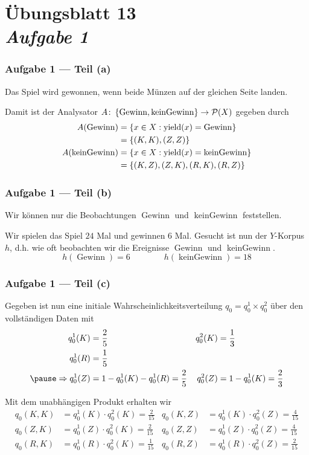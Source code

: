 \documentclass{beamer}
\DeclareMathOperator{\yield}{yield}
\DeclareMathOperator{\win}{Gewinn}
\DeclareMathOperator{\nowin}{kein Gewinn}
\begin{document}
\section{Übungsblatt 13 \\ \textit{Aufgabe 1}}

\begin{frame} \frametitle{Aufgabe 1 --- Teil (a)}
	\justifying \small	
	Das Spiel wird gewonnen, wenn beide Münzen auf der gleichen Seite landen.
	
	\pause
	
	Damit ist der Analysator $A \colon \menge{\win, \nowin} \to \mathcal{P}(X)$ gegeben durch
	\begin{equation*}
		\begin{aligned}
			A(\win) &= \menge{x \in X: \yield(x) = \win} \\
					&= \menge{(K,K), (Z,Z)} \\
			A(\nowin) &= \menge{x \in X: \yield(x) = \nowin} \\
					  &= \menge{(K,Z), (Z,K),(R,K),(R,Z)}
		\end{aligned}
	\end{equation*}
\end{frame}

\begin{frame} \frametitle{Aufgabe 1 --- Teil (b)}
	\justifying \small 
	Wir können nur die Beobachtungen $\win$ und $\nowin$ feststellen. 
	
	Wir spielen das Spiel $24$ Mal und gewinnen $6$ Mal. Gesucht ist nun der $Y$-Korpus $h$, d.h. wie oft beobachten wir die Ereignisse $\win$ und $\nowin$.
	\pause
	\begin{equation*}
		h(\win) = 6 \qquad\qquad h(\nowin) = 18
	\end{equation*}
\end{frame}

\begin{frame} \frametitle{Aufgabe 1 --- Teil (c)}
	\justifying \footnotesize
	Gegeben ist nun eine initiale Wahrscheinlichkeitsverteilung $q_0 = q_0^1 \times q_0^2$ über den vollständigen Daten mit
	\begin{align*}
	q_0^1(K) &= \frac{2}{5} & q_0^2(K) &= \frac{1}{3} \\
	q_0^1(R) &= \frac{1}{5} \\ \pause
	\Rightarrow
	q_0^1(Z) &= 1 - q_0^1(K) - q_0^1(R) = \frac{2}{5} 
	&
	q_0^2(Z) &= 1 - q_0^1(K) = \frac{2}{3}
	\end{align*}
	
	\pause
	Mit dem unabhängigen Produkt erhalten wir
	\begin{align*}
	q_0(K,K) &= q_0^1(K) \cdot q_0^2(K) = \frac{2}{15} 
	& q_0(K,Z) &= q_0^1(K) \cdot q_0^2(Z) = \frac{4}{15} \\
	q_0(Z,K) &= q_0^1(Z) \cdot q_0^2(K) = \frac{2}{15}
	& q_0(Z,Z) &= q_0^1(Z) \cdot q_0^2(Z) = \frac{4}{15} \\
	q_0(R,K) &= q_0^1(R) \cdot q_0^2(K) = \frac{1}{15}
	& q_0(R,Z) &= q_0^1(R) \cdot q_0^2(Z) = \frac{2}{15}
	\end{align*}
\end{frame}
\end{document}
